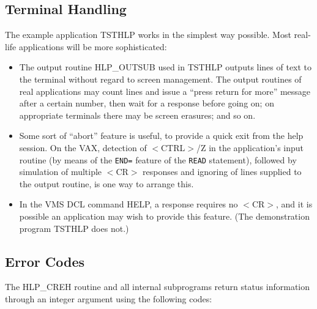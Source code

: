 \subsection{Terminal Handling}
The example application TSTHLP works in the simplest way possible.  Most
real-life applications will be more sophisticated:
\begin{itemize}
\item The output routine HLP\_OUTSUB used in
TSTHLP outputs lines of text to the terminal without
regard to screen management.  The output routines of real
applications may count lines and issue a ``press return for more''
message after a certain number, then wait for a response before going
on; on appropriate terminals there may be screen erasures; and
so on.
\item Some sort of ``abort'' feature is useful, to provide a
quick exit from the help session.  On the VAX,
detection of $<$CTRL$>$/Z in the
application's input routine (by means of the {\tt END=} feature
of the {\tt READ} statement), followed by simulation of multiple
$<$CR$>$ responses and ignoring of lines supplied to the output routine, is
one way to arrange this.
\item In the VMS DCL command HELP, a  response requires no
$<$CR$>$, and it is possible an application may wish to provide this
feature.  (The demonstration program TSTHLP does not.)
\end{itemize}

\subsection{Error Codes}
The HLP\_CREH routine and all internal subprograms
return status information through an integer argument using the
following codes:

